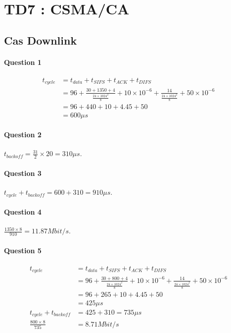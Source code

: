 \chapter{TD7 : CSMA/CA}
\section{Cas Downlink}
\subsubsection{Question 1}
\begin{align*}
t_{cycle} &= t_{data} + t_{SIFS} + t_{ACK} + t_{DIFS}\\
          &= 96 + \frac{30 + 1350 + 4}{\frac{24 \times 1024^2}{8}}
            + 10 \times 10^{-6} + \frac{14}{\frac{24 \times 1024^2}{8}}
            + 50 \times 10^{-6}\\
          &= 96 + 440 + 10 + 4.45 + 50\\
          &= 600 \mu s
\end{align*}

\subsubsection{Question 2}
$t_{backoff} = \frac{31}{2} \times 20 = 310 \mu s$.

\subsubsection{Question 3}
$t_{cycle} + t_{backoff} = 600 + 310 = 910 \mu s$.

\subsubsection{Question 4}
$\frac{1350 \times 8}{910} = 11.87 Mbit/s$.

\subsubsection{Question 5}
\begin{align*}
t_{cycle} &= t_{data} + t_{SIFS} + t_{ACK} + t_{DIFS}\\
          &= 96 + \frac{30 + 800 + 4}{\frac{24 \times 1024^2}{8}}
            + 10 \times 10^{-6} + \frac{14}{\frac{24 \times 1024^2}{8}}
            + 50 \times 10^{-6}\\
          &= 96 + 265 + 10 + 4.45 + 50\\
          &= 425 \mu s\\
t_{cycle} + t_{backoff} &= 425 + 310 = 735 \mu s\\
\frac{800 \times 8}{735} &= 8.71 Mbit/s
\end{align*}

